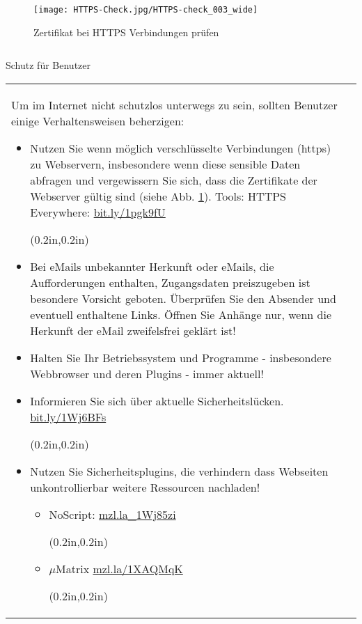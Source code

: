 \documentclass[final]{beamer}
\newcommand{\barcode}[1]{
\url{#1} \begin{pspicture}(0.2in,0.2in) 
\psbarcode[scalex=0.5,scaley=0.5]{#1}{}{qrcode} 
\end{pspicture}
}
\newlength{\sepwid}
\newlength{\twocolwid}
\begin{document}
\begin{frame}[t]
\begin{columns}[t, totalwidth=\textwidth]
\begin{column}{\twocolwid}
\begin{figure}
\centering
\texttt{[image: HTTPS-Check.jpg/HTTPS-check\_003\_wide]}
\caption{Zertifikat bei HTTPS Verbindungen prüfen}
\label{sslcert}
\end{figure}

\end{column} %

\begin{column}{\sepwid}\end{column} %

\end{columns} %
\begin{columns}[b]

\begin{column}{0.95\textwidth}

\begin{alertblock}{Schutz für Benutzer}
\setlength{\tabcolsep}{2cm}
\begin{tabular*}{20cm}{ ll }


\begin{minipage}[t]{0.45\linewidth}
\small {
Um im Internet nicht schutzlos unterwegs zu sein, sollten Benutzer einige Verhaltensweisen
beherzigen:

\begin{itemize}
 \item Nutzen Sie wenn möglich verschlüsselte Verbindungen (https) zu Webservern, insbesondere
 wenn diese sensible Daten abfragen und vergewissern Sie sich, dass die Zertifikate der Webserver
 gültig sind (siehe Abb. \ref{sslcert}).
 Tools: 
 HTTPS Everywhere: \barcode{bit.ly/1pgk9fU}
 
 \item Bei eMails unbekannter Herkunft oder eMails, die Aufforderungen enthalten, Zugangsdaten
 preiszugeben ist besondere Vorsicht geboten. Überprüfen Sie den Absender und eventuell enthaltene
 Links. Öffnen Sie Anhänge nur, wenn die Herkunft der eMail zweifelsfrei geklärt ist!
 
 \item Halten Sie Ihr Betriebssystem und Programme - insbesondere Webbrowser und deren Plugins - 
 immer aktuell!
 
 \item Informieren Sie sich über aktuelle Sicherheitslücken. \barcode{bit.ly/1Wj6BFs}
 
\item Nutzen Sie Sicherheitsplugins, die verhindern dass Webseiten unkontrollierbar weitere
 Ressourcen nachladen!
 \begin{itemize}
     \item NoScript: \barcode{mzl.la_1Wj85zi}
     \item $\mu{}$Matrix \barcode{mzl.la/1XAQMqK}
\end{itemize} 
 

\end{itemize}}
\end{minipage}
\end{tabular*}
\end{alertblock}
\end{column}
\end{columns}
\end{frame}
\end{document}
